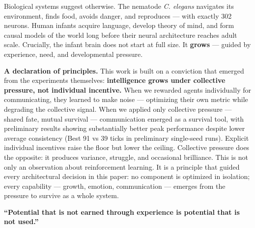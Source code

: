 \documentclass{article}
\begin{document}
Biological systems suggest otherwise. The nematode \textit{C. elegans} navigates its environment, finds food, avoids danger, and reproduces --- with exactly 302 neurons. Human infants acquire language, develop theory of mind, and form causal models of the world long before their neural architecture reaches adult scale. Crucially, the infant brain does not start at full size. It \textbf{grows} --- guided by experience, need, and developmental pressure.

\textbf{A declaration of principles.} This work is built on a conviction that emerged from the experiments themselves: \textbf{intelligence grows under collective pressure, not individual incentive.} When we rewarded agents individually for communicating, they learned to make noise --- optimizing their own metric while degrading the collective signal. When we applied only collective pressure --- shared fate, mutual survival --- communication emerged as a survival tool, with preliminary results showing substantially better peak performance despite lower average consistency (Best 91 vs 39 ticks in preliminary single-seed runs). Explicit individual incentives raise the floor but lower the ceiling. Collective pressure does the opposite: it produces variance, struggle, and occasional brilliance. This is not only an observation about reinforcement learning. It is a principle that guided every architectural decision in this paper: no component is optimized in isolation; every capability --- growth, emotion, communication --- emerges from the pressure to survive as a whole system.

\textbf{``Potential that is not earned through experience is potential that is not used.''}
\end{document}

